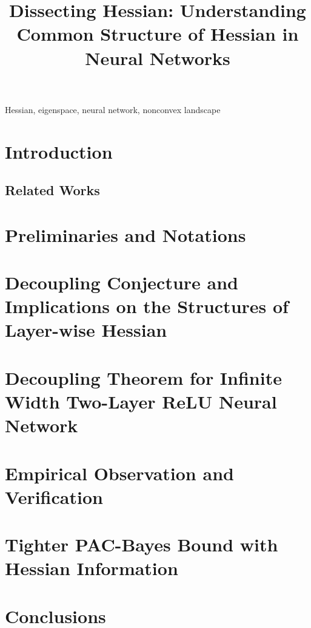 \documentclass[anon,12pt]{colt2022} %
\title[Dissecting Hessian]{Dissecting Hessian: Understanding Common Structure of Hessian in Neural Networks}
\begin{document}
\maketitle

\begin{abstract}%

\end{abstract}

\begin{keywords}%
  Hessian, eigenspace, neural network, nonconvex landscape%
\end{keywords}


\section{Introduction}


\subsection{Related Works}


\section{Preliminaries and Notations}


\section{Decoupling Conjecture and Implications on the Structures of Layer-wise Hessian}


\section{Decoupling Theorem for Infinite Width Two-Layer ReLU Neural Network}
\label{sec:theoretical}


\section{Empirical Observation and Verification}


\section{Tighter PAC-Bayes Bound with Hessian Information}


\section{Conclusions}






\appendix



\end{document}
